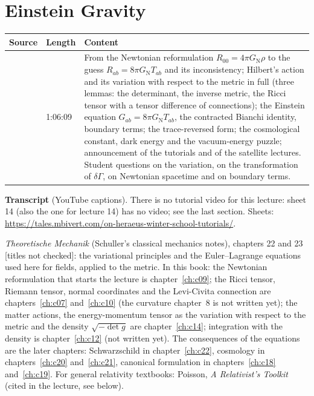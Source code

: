 \chapter{Einstein Gravity}\label{ch:c15}
\begin{paracol}{2}

\begin{sources}
\begin{tabularx}{\linewidth}{@{}l l L@{}}
\toprule
\textbf{Source} & \textbf{Length} & \textbf{Content}\\
\midrule
{} & 1:06:09 & From the Newtonian reformulation $R_{00}=4\pi G_{\mathrm N}\rho$ to the guess $R_{ab}=8\pi G_{\mathrm N}T_{ab}$ and its inconsistency; Hilbert's action and its variation with respect to the metric in full (three lemmas: the determinant, the inverse metric, the Ricci tensor with a tensor difference of connections); the Einstein equation $G_{ab}=8\pi G_{\mathrm N}T_{ab}$, the contracted Bianchi identity, boundary terms; the trace-reversed form; the cosmological constant, dark energy and the vacuum-energy puzzle; announcement of the tutorials and of the satellite lectures. Student questions on the variation, on the transformation of $\delta\Gamma$, on Newtonian spacetime and on boundary terms.\\
\bottomrule
\end{tabularx}

\smallskip
\textbf{Transcript}  (YouTube captions). There is no tutorial video for this lecture: sheet 14 (also the one for lecture 14) has no video; see the last section. Sheets: \url{https://tales.mbivert.com/on-heraeus-winter-school-tutorials/}.
\end{sources}

\begin{reading}
\emph{Theoretische Mechanik} (Schuller's classical mechanics notes), chapters 22 and 23 [titles not checked]: the variational principles and the Euler--Lagrange equations used here for fields, applied to the metric. In this book: the Newtonian reformulation that starts the lecture is chapter~\ref{ch:c09}; the Ricci tensor, Riemann tensor, normal coordinates and the Levi-Civita connection are chapters~\ref{ch:c07} and~\ref{ch:c10} (the curvature chapter~8 is not written yet); the matter actions, the energy-momentum tensor as the variation with respect to the metric and the density $\sqrt{-\det g}$ are chapter~\ref{ch:c14}; integration with the density is chapter~\ref{ch:c12} (not written yet). The consequences of the equations are the later chapters: Schwarzschild in chapter~\ref{ch:c22}, cosmology in chapters~\ref{ch:c20} and~\ref{ch:c21}, canonical formulation in chapters~\ref{ch:c18} and~\ref{ch:c19}. For general relativity textbooks: Poisson, \emph{A Relativist's Toolkit} (cited in the lecture, see below).
\end{reading}


\end{paracol}
